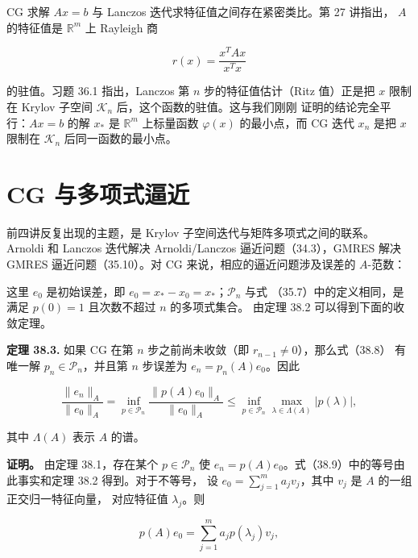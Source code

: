 \documentclass[UTF8,fontset=none,12pt]{ctexart}
\begin{document}
CG 求解 $Ax=b$ 与 Lanczos 迭代求特征值之间存在紧密类比。第 27 讲指出，
$A$ 的特征值是 $\mathbb R^m$ 上 Rayleigh 商

\[
r(x)=\frac{x^TAx}{x^Tx}
\]

的驻值。习题 36.1 指出，Lanczos 第 $n$ 步的特征值估计（Ritz 值）正是把
$x$ 限制在 Krylov 子空间 $\mathcal K_n$ 后，这个函数的驻值。这与我们刚刚
证明的结论完全平行：$Ax=b$ 的解 $x_\ast$ 是 $\mathbb R^m$ 上标量函数
$\varphi(x)$ 的最小点，而 CG 迭代 $x_n$ 是把 $x$ 限制在 $\mathcal K_n$
后同一函数的最小点。

\section*{CG 与多项式逼近}

前四讲反复出现的主题，是 Krylov 子空间迭代与矩阵多项式之间的联系。
Arnoldi 和 Lanczos 迭代解决 Arnoldi/Lanczos 逼近问题（34.3），GMRES
解决 GMRES 逼近问题（35.10）。对 CG 来说，相应的逼近问题涉及误差的
$A$-范数：

\begin{center}
\end{center}

这里 $e_0$ 是初始误差，即 $e_0=x_\ast-x_0=x_\ast$；$\mathcal P_n$ 与式
（35.7）中的定义相同，是满足 $p(0)=1$ 且次数不超过 $n$ 的多项式集合。
由定理 38.2 可以得到下面的收敛定理。

\textbf{定理 38.3.}
如果 CG 在第 $n$ 步之前尚未收敛（即 $r_{n-1}\ne0$），那么式（38.8）
有唯一解 $p_n\in\mathcal P_n$，并且第 $n$ 步误差为
$e_n=p_n(A)e_0$。因此

\begin{equation}
\frac{\lVert e_n\rVert_A}{\lVert e_0\rVert_A}
=\inf_{p\in\mathcal P_n}
\frac{\lVert p(A)e_0\rVert_A}{\lVert e_0\rVert_A}
\leq
\inf_{p\in\mathcal P_n}\max_{\lambda\in\Lambda(A)}|p(\lambda)|,
\tag{38.9}
\end{equation}

其中 $\Lambda(A)$ 表示 $A$ 的谱。

\textbf{证明。}
由定理 38.1，存在某个 $p\in\mathcal P_n$ 使
$e_n=p(A)e_0$。式（38.9）中的等号由此事实和定理 38.2 得到。对于不等号，
设 $e_0=\sum_{j=1}^m a_jv_j$，其中 $v_j$ 是 $A$ 的一组正交归一特征向量，
对应特征值 $\lambda_j$。则

\[
p(A)e_0=\sum_{j=1}^m a_jp(\lambda_j)v_j,
\]
\end{document}
